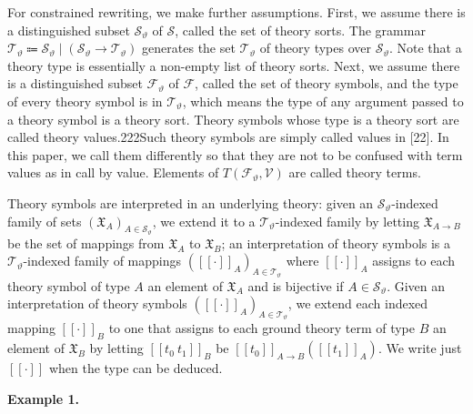 \documentclass[10pt,a4paper]{amsart}
\begin{document}
For constrained rewriting, we make further assumptions. First, we assume there is a distinguished subset ${\mathcal{S}}_{\vartheta}$ of $\mathcal{S}$, called the set of theory sorts. The grammar ${\mathcal{T}}_{\vartheta}\Coloneqq{\mathcal{S}}_{\vartheta}\mid({\mathcal{S}}_{\vartheta}\rightarrow{\mathcal{T}}_{\vartheta})$ generates the set ${\mathcal{T}}_{\vartheta}$ of theory types over ${\mathcal{S}}_{\vartheta}$. Note that a theory type is essentially a non-empty list of theory sorts. Next, we assume there is a distinguished subset ${\mathcal{F}}_{\vartheta}$ of $\mathcal{F}$, called the set of theory symbols, and the type of every theory symbol is in ${\mathcal{T}}_{\vartheta}$, which means the type of any argument passed to a theory symbol is a theory sort. Theory symbols whose type is a theory sort are called theory values.222Such theory symbols are simply called values in [22]. In this paper, we call them differently so that they are not to be confused with term values as in call by value. Elements of $T({\mathcal{F}}_{\vartheta},\mathcal{V})$ are called theory terms.\par
 
 
 
Theory symbols are interpreted in an underlying theory: given an ${\mathcal{S}}_{\vartheta}$-indexed family of sets $(\mathfrak{X}_{A})_{A\in{\mathcal{S}}_{\vartheta}}$, we extend it to a ${\mathcal{T}}_{\vartheta}$-indexed family by letting $\mathfrak{X}_{A\rightarrow B}$ be the set of mappings from $\mathfrak{X}_{A}$ to $\mathfrak{X}_{B}$; an interpretation of theory symbols is a ${\mathcal{T}}_{\vartheta}$-indexed family of mappings $([\![\cdot]\!]_{A})_{A\in{\mathcal{T}}_{\vartheta}}$ where $[\![\cdot]\!]_{A}$ assigns to each theory symbol of type $A$ an element of $\mathfrak{X}_{A}$ and is bijective if $A\in{\mathcal{S}}_{\vartheta}$. Given an interpretation of theory symbols $([\![\cdot]\!]_{A})_{A\in{\mathcal{T}}_{\vartheta}}$, we extend each indexed mapping $[\![\cdot]\!]_{B}$ to one that assigns to each ground theory term of type $B$ an element of $\mathfrak{X}_{B}$ by letting $[\![{t_{0}}\ {t_{1}}]\!]_{B}$ be $[\![t_{0}]\!]_{A\rightarrow B}([\![t_{1}]\!]_{A})$. We write just $[\![\cdot]\!]$ when the type can be deduced.\par
 
 
 
\par\medskip\noindent\textbf{Example 1.}\par
 
\end{document}
